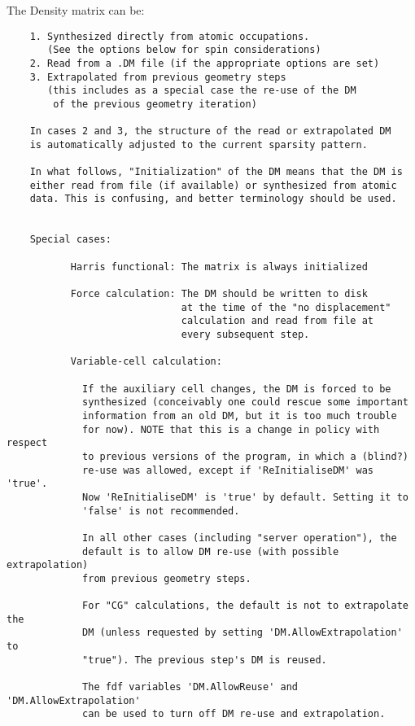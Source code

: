 The Density matrix can be:

\begin{verbatim}
    1. Synthesized directly from atomic occupations.
       (See the options below for spin considerations)
    2. Read from a .DM file (if the appropriate options are set)
    3. Extrapolated from previous geometry steps
       (this includes as a special case the re-use of the DM 
        of the previous geometry iteration)

    In cases 2 and 3, the structure of the read or extrapolated DM
    is automatically adjusted to the current sparsity pattern.

    In what follows, "Initialization" of the DM means that the DM is
    either read from file (if available) or synthesized from atomic
    data. This is confusing, and better terminology should be used.


    Special cases:

           Harris functional: The matrix is always initialized

           Force calculation: The DM should be written to disk
                              at the time of the "no displacement"
                              calculation and read from file at
                              every subsequent step.

           Variable-cell calculation:
   
             If the auxiliary cell changes, the DM is forced to be
             synthesized (conceivably one could rescue some important
             information from an old DM, but it is too much trouble
             for now). NOTE that this is a change in policy with respect
             to previous versions of the program, in which a (blind?)
             re-use was allowed, except if 'ReInitialiseDM' was 'true'.
             Now 'ReInitialiseDM' is 'true' by default. Setting it to
             'false' is not recommended.

             In all other cases (including "server operation"), the
             default is to allow DM re-use (with possible extrapolation)
             from previous geometry steps.

             For "CG" calculations, the default is not to extrapolate the
             DM (unless requested by setting 'DM.AllowExtrapolation' to
             "true"). The previous step's DM is reused.

             The fdf variables 'DM.AllowReuse' and 'DM.AllowExtrapolation'
             can be used to turn off DM re-use and extrapolation.

\end{verbatim}


